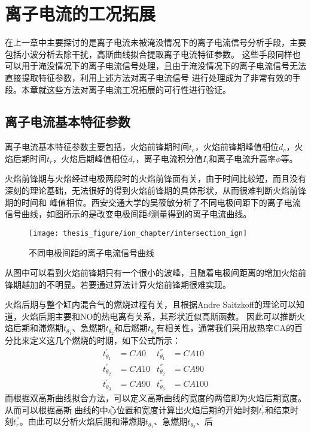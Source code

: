 \chapter{离子电流的工况拓展}
在上一章中主要探讨的是离子电流未被淹没情况下的离子电流信号分析手段，主要包括小波分析去除干扰，高斯曲线拟合提取离子电流特征参数。
这些手段同样也可以用于淹没情况下的离子电流信号处理，且由于淹没情况下的离子电流信号无法直接提取特征参数，利用上述方法对离子电流信号
进行处理成为了非常有效的手段。本章就这些方法对离子电流工况拓展的可行性进行验证。
\section{离子电流基本特征参数}
离子电流基本特征参数主要包括，火焰前锋期时间$t_c$，火焰前锋期峰值相位$d_c$，火焰后期时间$t_r$，火焰后期峰值相位$d_r$，离子电流积分值$I_i$和离子电流升高率$\phi$等。\par
火焰前锋期与火焰经过电极两段时的火焰前锋面有关，由于时间比较短，而且没有深刻的理论基础，无法很好的得到火焰前锋期的具体形状，从而很难判断火焰前锋期的时间和
峰值相位。西安交通大学的吴筱敏\cite{iign}分析了不同电极间距下的离子电流信号曲线，如图\label{fig:intersection_ign}所示的是改变电极间距$\delta$测量得到的离子电流曲线。
\begin{figure}[!htpb]
	\centering
	\texttt{[image: thesis\_figure/ion\_chapter/intersection\_ign]}
	\caption{\label{fig:intersection_ign}不同电极间距的离子电流信号曲线}
\end{figure}
从图\label{fig:intersection_ign}中可以看到火焰前锋期只有一个很小的波峰，且随着电极间距离的增加火焰前锋期越加的不明显。若要通过算法计算火焰前锋期很难实现。\par
火焰后期与整个缸内混合气的燃烧过程有关，且根据Andre Saitzkoff\cite{saitzkoff1996ionization}的理论可以知道，火焰后期主要和NO的热电离有关系，其形状近似高斯函数。
因此可以推断火焰后期和滞燃期$t_{\theta_1}$、急燃期$t_{\theta_2}$和后燃期$t_{\theta_3}$有相关性，通常我们采用放热率CA的百分比来定义这几个燃烧的时期，如下公式所示：
\begin{align}
	t_{\theta_1}^{'} &= CA0  & t_{\theta_1}^{''} &=CA10 \\
	t_{\theta_2}^{'} &= CA10 & t_{\theta_2}^{''} &=CA90 \\
	t_{\theta_3}^{'} &= CA90 & t_{\theta_3}^{''} &=CA100 
\end{align}
而根据双高斯曲线拟合方法，可以定义高斯曲线的宽度的两倍即为火焰后期宽度。从而可以根据高斯
曲线的中心位置和宽度计算出火焰后期的开始时刻$t_{r}^{'}$和结束时刻$t_{r}^{''}$。由此可以分析火焰后期和滞燃期$t_{\theta_1}$、急燃期$t_{\theta_2}$、后
